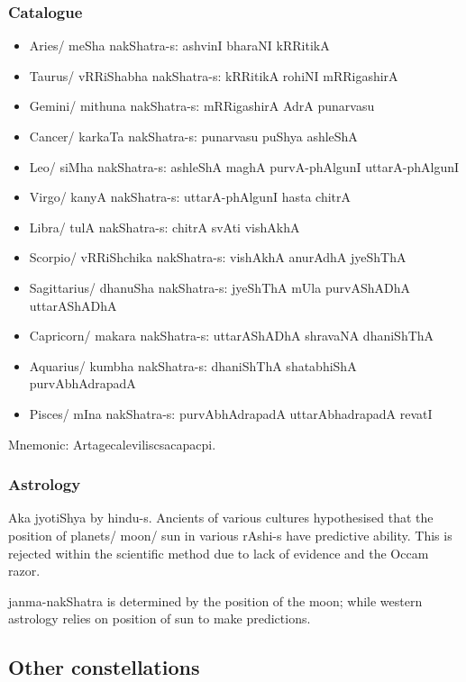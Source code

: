 \documentclass[oneside, article]{memoir}
\begin{document}
\subsubsection{Catalogue}
\begin{itemize}
\item Aries/ meSha
\subitem nakShatra-s:
 ashvinI
 bharaNI
 kRRitikA
\item Taurus/ vRRiShabha 
\subitem nakShatra-s:
 kRRitikA
 rohiNI
 mRRigashirA
\item Gemini/ mithuna
\subitem nakShatra-s:
 mRRigashirA
 AdrA
 punarvasu
\item Cancer/ karkaTa
\subitem nakShatra-s:
 punarvasu
 puShya
 ashleShA
\item Leo/ siMha
\subitem nakShatra-s:
 ashleShA
 maghA
 purvA-phAlgunI
 uttarA-phAlgunI
\item Virgo/ kanyA
\subitem nakShatra-s:
 uttarA-phAlgunI
 hasta
 chitrA
\item Libra/ tulA
\subitem nakShatra-s:
 chitrA
 svAti
 vishAkhA
\item Scorpio/ vRRiShchika
\subitem nakShatra-s:
 vishAkhA
 anurAdhA
 jyeShThA
\item Sagittarius/ dhanuSha
\subitem nakShatra-s:
 jyeShThA
 mUla
 purvAShADhA
 uttarAShADhA
\item Capricorn/ makara
\subitem nakShatra-s:
 uttarAShADhA
 shravaNA
 dhaniShThA
\item Aquarius/ kumbha
\subitem nakShatra-s:
 dhaniShThA
 shatabhiShA
 purvAbhAdrapadA
\item Pisces/ mIna
\subitem nakShatra-s:
 purvAbhAdrapadA
 uttarAbhadrapadA
 revatI
\end{itemize}

Mnemonic: Artagecaleviliscsacapacpi.

\subsubsection{Astrology}
Aka jyotiShya by hindu-s. Ancients of various cultures hypothesised that the position of planets/ moon/ sun in various rAshi-s have predictive ability. This is rejected within the scientific method due to lack of evidence and the Occam razor.

janma-nakShatra is determined by the position of the moon; while western astrology relies on position of sun to make predictions.

\subsection{Other constellations}
\end{document}
